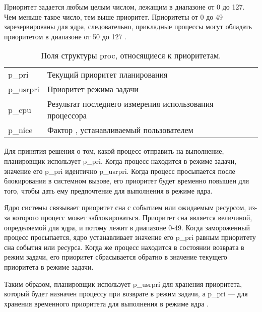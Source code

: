 Приоритет задается любым целым числом, лежащим в диапазоне от 0 до 127. Чем меньше такое число, тем выше приоритет. Приоритеты от 0 до 49 зарезервированы для ядра, следовательно, прикладные процессы могут обладать приоритетом в диапазоне от 50 до 127 \cite{unix5}. 

\begin{table}[h]
	\begin{center}
		\captionsetup{justification=raggedright,singlelinecheck=off}
		\caption{\label{tbl:best}Поля структуры {\ttfamily proc}, относящиеся к приоритетам.}
		\begin{tabular}{lll}
			\hline
			p\_pri & Текущий приоритет планирования \\
			p\_usrpri & Приоритет режима задачи \\
			p\_cpu & Результат последнего измерения использования процессора \\
			p\_nice & Фактор \guillemotright, устанавливаемый пользователем \\
			\hline
		\end{tabular}
	\end{center}
\end{table}

Для принятия решения о том, какой процесс отправить на выполнение, планировщик использует {\ttfamily p\_pri}. Когда процесс находится в режиме задачи, значение его {\ttfamily p\_pri} идентично {\ttfamily p\_usrpri}. Когда процесс просыпается после блокирования в системном вызове, его приоритет будет временно повышен для того, чтобы дать ему предпочтение для выполнения в режиме ядра. 

Ядро системы связывает приоритет сна с событием или ожидаемым ресурсом, из-за которого процесс может заблокироваться. Приоритет сна является величиной, определяемой для ядра, и потому лежит в диапазоне 0-49. Когда замороженный процесс просыпается, ядро устанавливает значение его {\ttfamily p\_pri} равным приоритету сна события или ресурса.
Когда же процесс находится в состоянии возврата в режим задачи, его приоритет сбрасывается обратно в значение текущего приоритета в режиме задачи.

Таким образом, планировщик использует {\ttfamily p\_usrpri} для хранения приоритета, который будет назначен процессу при возврате в режим задачи, а {\ttfamily p\_pri} --- для хранения временного приоритета для выполнения в режиме ядра \cite{unix5}.

